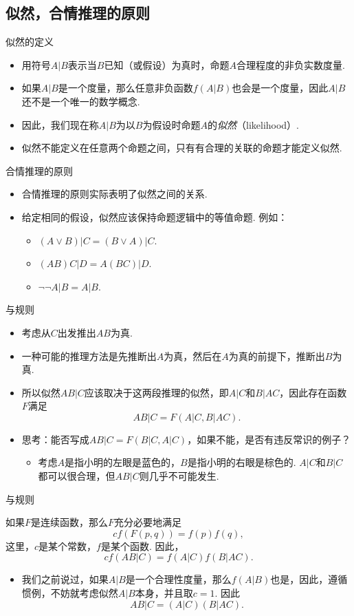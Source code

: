 \subsection{似然，合情推理的原则}
{似然的定义}
\begin{itemize}
    \item 用符号$A|B$表示当$B$已知（或假设）为真时，命题$A$合理程度的非负实数度量.
    \item 如果$A|B$是一个度量，那么任意非负函数$f(A|B)$也会是一个度量，因此$A|B$还不是一个唯一的数学概念.
    \item 因此，我们现在称$A|B$为以$B$为假设时命题$A$的\emph{似然}（likelihood）.
    \item 似然不能定义在任意两个命题之间，只有有合理的关联的命题才能定义似然.
\end{itemize}


{合情推理的原则}
\begin{itemize}
    \item 合情推理的原则实际表明了似然之间的关系.
    \item 给定相同的假设，似然应该保持命题逻辑中的等值命题. 例如：
    \begin{itemize}
        \item $(A\vee B) | C=(B\vee A) | C$.
        \item $(AB)C|D=A(BC)|D$.
        \item $\neg\neg A|B=A|B$.
    \end{itemize}
\end{itemize}


{与规则}
\begin{itemize}
    \item 考虑从$C$出发推出$AB$为真.
    \item 一种可能的推理方法是先推断出$A$为真，然后在$A$为真的前提下，推断出$B$为真.
    \item 所以似然$AB|C$应该取决于这两段推理的似然，即$A|C$和$B|AC$，因此存在函数$F$满足
    \[
        AB|C=F(A|C,B|AC).
    \]
    \item 思考：能否写成$AB|C = F(B|C, A|C)$，如果不能，是否有违反常识的例子？
    \begin{itemize}
        \item 考虑$A$是指小明的左眼是蓝色的，$B$是指小明的右眼是棕色的. $A|C$和$B|C$都可以很合理，但$AB|C$则几乎不可能发生.
    \end{itemize}
\end{itemize}


{与规则}
    \begin{theorem}
    如果$F$是连续函数，那么$F$充分必要地满足
        \[cf(F(p,q))=f(p)f(q),\]
        这里，$c$是某个常数，$f$是某个函数.
        因此，
        \[cf(AB|C)=f(A|C)f(B|AC).\]
    \end{theorem}
\begin{itemize}
    \item 我们之前说过，如果$A|B$是一个合理性度量，那么$f(A|B)$也是，因此，遵循惯例，不妨就考虑似然$A|B$本身，并且取$c=1$. 因此
        \[AB|C=(A|C)(B|AC).\]
\end{itemize}


